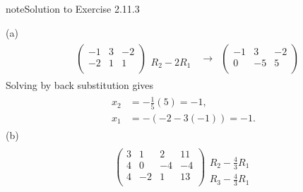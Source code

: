 \documentclass[letterpaper,10pt,english]{jupyterBook}
\begin{document}
\begin{sphinxadmonition}{note}{Solution to Exercise 2.11.3}



\sphinxAtStartPar
(a)
\begin{equation*}
\begin{split} \begin{align*} 
    & \left( \begin{array}{cc|c} 
         -1 & 3 & -2 \\ 
         -2 & 1 & 1 \\ 
    \end{array} \right) 
    \begin{array}{l} \phantom{x} \\ R_{2} - 2 R_{1} \end{array} & 
    \longrightarrow 
    & \left( \begin{array}{cc|c} 
         -1 & 3 & -2 \\ 
         0 & -5 & 5 \\ 
    \end{array} \right) 
\end{align*} \end{split}
\end{equation*}
\sphinxAtStartPar
Solving by back substitution gives
\begin{equation*}
\begin{split} \begin{align*} 
    x_{2} &=  - \frac{1}{5} \left( 5 \right) = -1, \\ 
    x_{1} &=  - \left( -2 - 3 \left( -1 \right) \right) = -1. 
\end{align*} \end{split}
\end{equation*}
\sphinxAtStartPar
(b)
\begin{equation*}
\begin{split} \begin{align*} 
    & \left( \begin{array}{ccc|c} 
         3 & 1 & 2 & 11 \\ 
         4 & 0 & -4 & -4 \\ 
         4 & -2 & 1 & 13 \\ 
    \end{array} \right) 
    \begin{array}{l} \phantom{x} \\ R_{2} - \frac{4}{3} R_{1} \\ R_{3} - \frac{4}{3} R_{1} \end{array} & 

\end{align*}
\end{split}
\end{equation*}
\end{sphinxadmonition}
\end{document}

